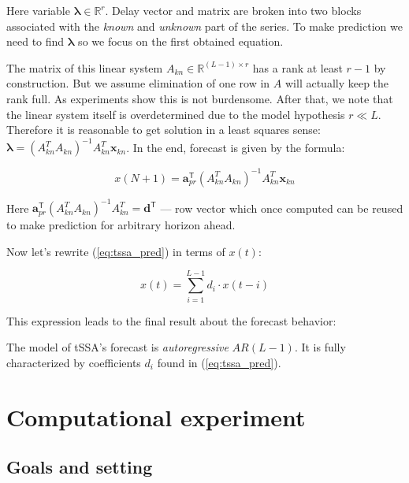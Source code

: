 	Here variable $ \boldsymbol{\lambda} \in \mathbb{R}^r $. Delay vector and matrix are broken into two blocks associated with the \emph{known} and \emph{unknown} part of the series. To make prediction we need to find $ \boldsymbol{\lambda} $ so we focus on the first obtained equation.
	
	The matrix of this linear system $ A_{kn} \in \mathbb{R}^{(L - 1) \times r} $ has a rank at least $ r - 1 $ by construction. But we assume elimination of one row in $ A $ will actually keep the rank full. As experiments show this is not burdensome. After that, we note that the linear system itself is overdetermined due to the model hypothesis $ r \ll L $. Therefore it is reasonable to get solution in a least squares sense: $ \boldsymbol{\lambda} = (A_{kn}^T A_{kn})^{-1} A_{kn}^T \mathbf{x}_{kn} $. In the end, forecast is given by the formula:
	
	\begin{equation}\label{eq:tssa_pred}
		x(N + 1) = \mathbf{a}_{pr}^{\mathsf{T}} (A_{kn}^T A_{kn})^{-1} A_{kn}^T \mathbf{x}_{kn}
	\end{equation}
	
	Here $ \mathbf{a}_{pr}^{\mathsf{T}} (A_{kn}^T A_{kn})^{-1} A_{kn}^T = \mathbf{d}^{\mathsf{T}} $ --- row vector which once computed can be reused to make prediction for arbitrary horizon ahead.
	
	Now let's rewrite (\ref{eq:tssa_pred}) in terms of $ x(t) $:
	
	\begin{equation*}\label{eq:autoregr}
		x(t) = \sum\limits_{i = 1}^{L - 1} d_i \cdot x(t - i)
	\end{equation*}
	
	This expression leads to the final result about the forecast behavior:
	
	\begin{Th}		
		The model of tSSA's forecast is \emph{autoregressive} $ AR(L - 1) $. It is fully characterized by coefficients $ d_i $ found in (\ref{eq:tssa_pred}).
	\end{Th}
	
	\section{Computational experiment}	
	
	\subsection*{Goals and setting}
	
